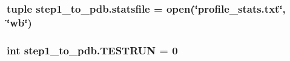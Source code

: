 \hypertarget{namespacestep1__to__pdb_a2766ad30243ded186ba90c1d630c8caa}{
\subsubsection[{statsfile}]{\setlength{\rightskip}{0pt plus 5cm}tuple step1\-\_\-to\-\_\-pdb.\-statsfile = open(\char`\"{}profile\-\_\-stats.\-txt\char`\"{}, \char`\"{}wb\char`\"{})}}\label{namespacestep1__to__pdb_a2766ad30243ded186ba90c1d630c8caa}
\hypertarget{namespacestep1__to__pdb_ac66d5feff2aae1ab64fcca1ab35a637c}{
\subsubsection[{T\-E\-S\-T\-R\-U\-N}]{\setlength{\rightskip}{0pt plus 5cm}int step1\-\_\-to\-\_\-pdb.\-T\-E\-S\-T\-R\-U\-N = 0}}\label{namespacestep1__to__pdb_ac66d5feff2aae1ab64fcca1ab35a637c}
